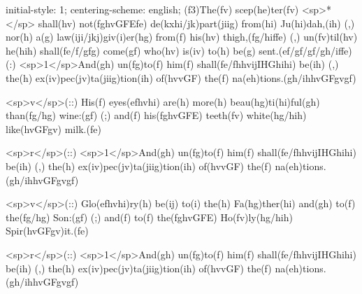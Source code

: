 initial-style: 1;
centering-scheme: english;
(f3)The(fv) scep(he)ter(fv) <sp>*</sp> shall(hv) not(fghvGFEfe) de(kxhi/jk)part(jiig) from(hi) Ju(hi)dah,(ih) (,) nor(h) a(g) law(iji/jkj)giv(i)er(hg) from(f) his(hv) thigh,(fg/hiffe) (,) un(fv)til(hv) he(hih) shall(fe/f/gfg) come(gf) who(hv) is(iv) to(h) be(g) sent.(ef/gf/gf/gh/iffe) (:) <sp>1</sp>And(gh) un(fg)to(f) him(f) shall(fe/fhhvijIHGhihi) be(ih) (,) the(h) ex(iv)pec(jv)ta(jiig)tion(ih) of(hvvGF) the(f) na(eh)tions.(gh/ihhvGFgvgf) 

<sp>v</sp>(::) His(f) eyes(efhvhi) are(h) more(h) beau(hg)ti(hi)ful(gh) than(fg/hg) wine:(gf) (;) and(f) his(fghvGFE) teeth(fv) white(hg/hih) like(hvGFgv) milk.(fe) 

<sp>r</sp>(::) <sp>1</sp>And(gh) un(fg)to(f) him(f) shall(fe/fhhvijIHGhihi) be(ih) (,) the(h) ex(iv)pec(jv)ta(jiig)tion(ih) of(hvvGF) the(f) na(eh)tions.(gh/ihhvGFgvgf) 

<sp>v</sp>(::) Glo(efhvhi)ry(h) be(ij) to(i) the(h) Fa(hg)ther(hi) and(gh) to(f) the(fg/hg) Son:(gf) (;) and(f) to(f) the(fghvGFE) Ho(fv)ly(hg/hih) Spir(hvGFgv)it.(fe)

<sp>r</sp>(::) <sp>1</sp>And(gh) un(fg)to(f) him(f) shall(fe/fhhvijIHGhihi) be(ih) (,) the(h) ex(iv)pec(jv)ta(jiig)tion(ih) of(hvvGF) the(f) na(eh)tions.(gh/ihhvGFgvgf) 
